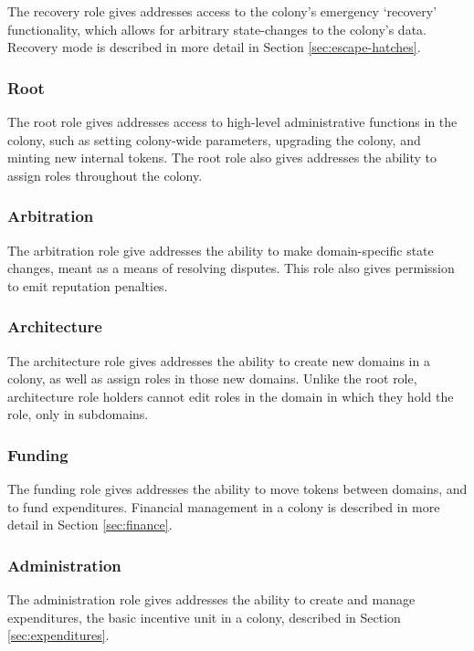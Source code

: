 The recovery role gives addresses access to the colony's emergency `recovery' functionality, which allows for arbitrary state-changes to the colony's data. Recovery mode is described in more detail in Section \ref{sec:escape-hatches}.

\subsubsection{Root}

The root role gives addresses access to high-level administrative functions in the colony, such as setting colony-wide parameters, upgrading the colony, and minting new internal tokens. The root role also gives addresses the ability to assign roles throughout the colony.

\subsubsection{Arbitration}

The arbitration role give addresses the ability to make domain-specific state changes, meant as a means of resolving disputes. This role also gives permission to emit reputation penalties.

\subsubsection{Architecture}

The architecture role gives addresses the ability to create new domains in a colony, as well as assign roles in those new domains. Unlike the root role, architecture role holders cannot edit roles in the domain in which they hold the role, only in subdomains.

\subsubsection{Funding}

The funding role gives addresses the ability to move tokens between domains, and to fund expenditures. Financial management in a colony is described in more detail in Section \ref{sec:finance}.

\subsubsection{Administration}

The administration role gives addresses the ability to create and manage expenditures, the basic incentive unit in a colony, described in Section \ref{sec:expenditures}.

